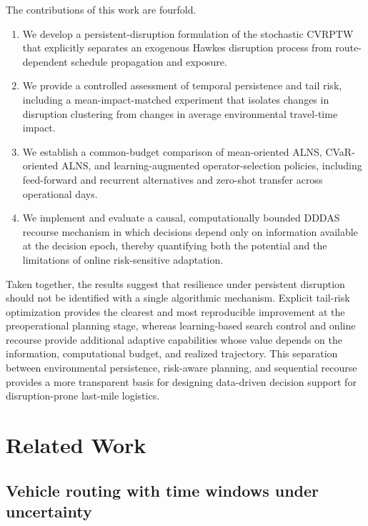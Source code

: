 \documentclass[preprint,12pt]{elsarticle}
\newcommand{\1}{\mathbf{1}}
\begin{document}
The contributions of this work are fourfold.
\begin{enumerate}
	\item We develop a persistent-disruption formulation of the stochastic CVRPTW that
	explicitly separates an exogenous Hawkes disruption process from route-dependent
	schedule propagation and exposure.
	
	\item We provide a controlled assessment of temporal persistence and tail risk,
	including a mean-impact-matched experiment that isolates changes in disruption
	clustering from changes in average environmental travel-time impact.
	
	\item We establish a common-budget comparison of mean-oriented ALNS, CVaR-oriented
	ALNS, and learning-augmented operator-selection policies, including feed-forward and
	recurrent alternatives and zero-shot transfer across operational days.
	
	\item We implement and evaluate a causal, computationally bounded DDDAS recourse
	mechanism in which decisions depend only on information available at the decision
	epoch, thereby quantifying both the potential and the limitations of online
	risk-sensitive adaptation.
\end{enumerate}

Taken together, the results suggest that resilience under persistent disruption should not
be identified with a single algorithmic mechanism.
Explicit tail-risk optimization provides the clearest and most reproducible improvement
at the preoperational planning stage, whereas learning-based search control and online
recourse provide additional adaptive capabilities whose value depends on the information,
computational budget, and realized trajectory.
This separation between environmental persistence, risk-aware planning, and sequential
recourse provides a more transparent basis for designing data-driven decision support for
disruption-prone last-mile logistics.




\section{Related Work}
\label{sec:related_work}

\subsection{Vehicle routing with time windows under uncertainty}
\end{document}
